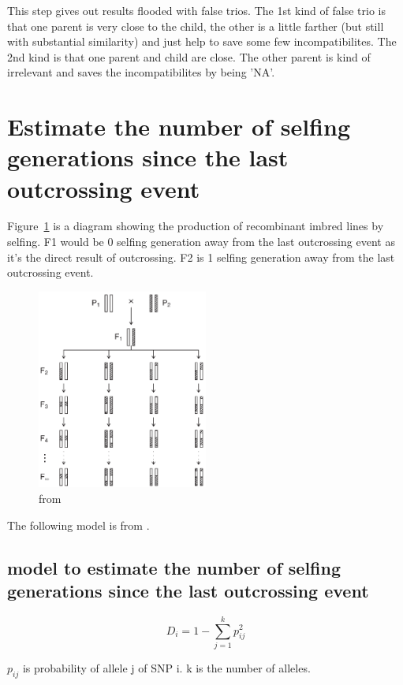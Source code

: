 \documentclass[a4paper,10pt]{article}
\begin{document}
This step gives out results flooded with false trios. The 1st kind of false trio is that one parent is very close to the child, the other is a little farther (but still with substantial similarity) and just help to save some few incompatibilites. The 2nd kind is that one parent and child are close. The other parent is kind of irrelevant and saves the incompatibilites by being 'NA'.

\section{Estimate the number of selfing generations since the last outcrossing event}
Figure~\ref{f6} is a diagram showing the production of recombinant imbred lines by selfing. F1 would be 0 selfing generation away from the last outcrossing event as it's the direct result of outcrossing. F2 is 1 selfing generation away from the last outcrossing event.

\begin{figure}
\includegraphics[width=0.5\textwidth]{figures/selfing_diagram.png}
\caption{from \cite{Broman2005}}\label{f6}
\end{figure}

The following model is from \cite{Enjalbert2000}.

\subsection{model to estimate the number of selfing generations since the last outcrossing event}
\begin{equation}
D_i = 1 - \sum_{j=1}^k p_{ij}^2
\end{equation}


$p_{ij}$ is probability of allele j of SNP i. k is the number of alleles.
\end{document}
